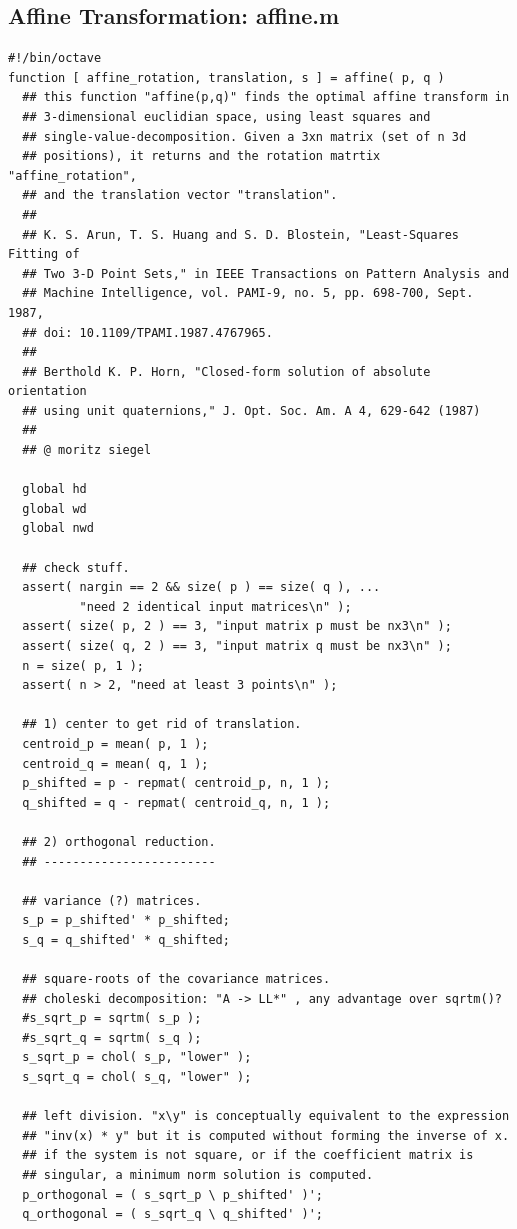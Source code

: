 \documentclass[11pt, a4paper, oneside, twocolumn]{report}
\newcommand{\n}{\textnormal}
\begin{document}
\subsection{Affine Transformation: affine.m}\label{s:c:affine}

\begin{verbatim}
#!/bin/octave
function [ affine_rotation, translation, s ] = affine( p, q )
  ## this function "affine(p,q)" finds the optimal affine transform in
  ## 3-dimensional euclidian space, using least squares and
  ## single-value-decomposition. Given a 3xn matrix (set of n 3d
  ## positions), it returns and the rotation matrtix "affine_rotation",
  ## and the translation vector "translation".
  ##
  ## K. S. Arun, T. S. Huang and S. D. Blostein, "Least-Squares Fitting of
  ## Two 3-D Point Sets," in IEEE Transactions on Pattern Analysis and
  ## Machine Intelligence, vol. PAMI-9, no. 5, pp. 698-700, Sept. 1987,
  ## doi: 10.1109/TPAMI.1987.4767965.
  ##
  ## Berthold K. P. Horn, "Closed-form solution of absolute orientation
  ## using unit quaternions," J. Opt. Soc. Am. A 4, 629-642 (1987)
  ##
  ## @ moritz siegel

  global hd
  global wd
  global nwd
  
  ## check stuff.
  assert( nargin == 2 && size( p ) == size( q ), ...
          "need 2 identical input matrices\n" );
  assert( size( p, 2 ) == 3, "input matrix p must be nx3\n" );
  assert( size( q, 2 ) == 3, "input matrix q must be nx3\n" );
  n = size( p, 1 );
  assert( n > 2, "need at least 3 points\n" );

  ## 1) center to get rid of translation.
  centroid_p = mean( p, 1 );
  centroid_q = mean( q, 1 );
  p_shifted = p - repmat( centroid_p, n, 1 );
  q_shifted = q - repmat( centroid_q, n, 1 );
  
  ## 2) orthogonal reduction.
  ## ------------------------
  
  ## variance (?) matrices.
  s_p = p_shifted' * p_shifted;
  s_q = q_shifted' * q_shifted;

  ## square-roots of the covariance matrices.
  ## choleski decomposition: "A -> LL*" , any advantage over sqrtm()?
  #s_sqrt_p = sqrtm( s_p );
  #s_sqrt_q = sqrtm( s_q );
  s_sqrt_p = chol( s_p, "lower" );
  s_sqrt_q = chol( s_q, "lower" );
  
  ## left division. "x\y" is conceptually equivalent to the expression
  ## "inv(x) * y" but it is computed without forming the inverse of x.
  ## if the system is not square, or if the coefficient matrix is
  ## singular, a minimum norm solution is computed.
  p_orthogonal = ( s_sqrt_p \ p_shifted' )';
  q_orthogonal = ( s_sqrt_q \ q_shifted' )';
  

\end{verbatim}
\end{document}
